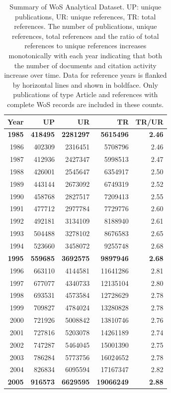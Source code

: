 \documentclass[NETN]{stjour}
\begin{document}
\begin{table}[ht]
\caption{Summary of WoS Analytical Dataset. UP: unique publications, UR: unique references, TR: total references. The number of publications, unique references, total references and the ratio of total references to unique references increases monotonically with each year indicating that both the number of documents and citation activity increase over time. Data for reference years is flanked by horizontal lines and shown in boldface. Only publications of type Article and references with complete WoS records are included in these counts.}
\centering
\begin{tabular}{|rrrrr|}
  \hline
Year & UP & UR & TR & TR/UR \\ 
  \hline
\textbf{1985} & \textbf{418495} & \textbf{2281297} & \textbf{5615496} & \textbf{2.46} \\ 
\hline
1986 & 402309 & 2316451 & 5708796 & 2.46 \\ 
1987 & 412936 & 2427347 & 5998513 & 2.47 \\ 
1988 & 426001 & 2545647 & 6354917 & 2.50 \\ 
1989 & 443144 & 2673092 & 6749319 & 2.52 \\ 
1990 & 458768 & 2827517 & 7209413 & 2.55 \\ 
1991 & 477712 & 2977784 & 7729776 & 2.60 \\ 
1992 & 492181 & 3134109 & 8188940 & 2.61 \\ 
1993 & 504488 & 3278102 & 8676583 & 2.65 \\ 
1994 & 523660 & 3458072 & 9255748 & 2.68 \\ 
 \hline
\textbf{1995} & \textbf{559685} & \textbf{3692575} & \textbf{9897946} & \textbf{2.68} \\ 
\hline
1996 & 663110 & 4144581 & 11641286 & 2.81 \\ 
1997 & 677077 & 4340733 & 12135104 & 2.80 \\ 
1998 & 693531 & 4573584 & 12728629 & 2.78 \\ 
1999 & 709827 & 4784024 & 13280828 & 2.78 \\ 
 2000 & 721926 & 5008842 & 13810746 & 2.76 \\ 
 2001 & 727816 & 5203078 & 14261189 & 2.74 \\ 
 2002 & 747287 & 5464045 & 15001390 & 2.75 \\ 
 2003 & 786284 & 5773756 & 16024652 & 2.78 \\ 
 2004 & 826834 & 6095594 & 17167347 & 2.82 \\ 
 \hline
\textbf{2005} & \textbf{916573} & \textbf{6629595} & \textbf{19066249} & \textbf{2.88} \\ 
 \hline
\end{tabular}
\end{table}
\end{document}
